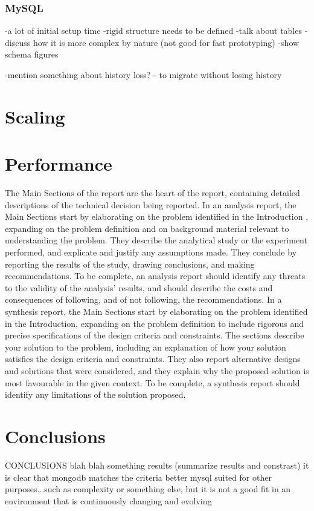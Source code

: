 \documentclass[12pt]{article}
\begin{document}
\subsubsection{MySQL}
-a lot of initial setup time
-rigid structure needs to be defined
-talk about tables
-discuss how it is more complex by nature (not good for fast prototyping)
-show schema figures

-mention something about history loss? - to migrate without losing history

\section{Scaling}

\section{Performance}
The Main Sections of the report are the heart of the report, containing detailed descriptions of the technical decision being reported. In an analysis report, the Main Sections start by elaborating on the problem identified in the Introduction , expanding on the problem definition and on background material relevant to understanding the problem. They describe the analytical study or the experiment performed, and explicate and justify any assumptions made. They conclude by reporting the results of the study, drawing conclusions, and making recommendations. To be complete, an analysis report should identify any threats to the validity of the analysis' results, and should describe the costs and consequences of following, and of not following, the recommendations. In a synthesis report, the Main Sections start by elaborating on the problem identified in the Introduction, expanding on the problem definition to include rigorous and precise specifications of the design criteria and constraints. The sections describe your solution to the problem, including an explanation of how your solution satisfies the design criteria and constraints. They also report alternative designs and solutions that were considered, and they explain why the proposed solution is most favourable in the given context. To be complete, a synthesis report should identify any limitations of the solution proposed.



\section{Conclusions}
CONCLUSIONS
blah blah something results (summarize results and constrast)
it is clear that mongodb matches the criteria better
mysql suited for other purposes...such as complexity or something else, but it is not a good fit in an environment that is continuously changing and evolving
\cite{smpl}
\end{document}
